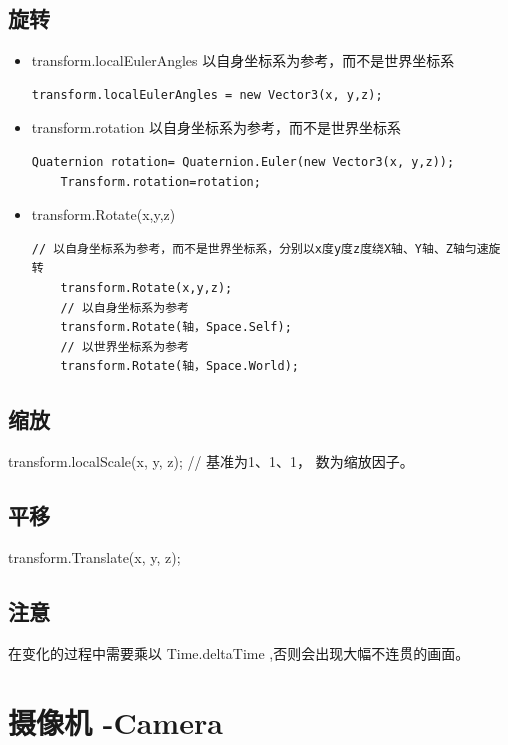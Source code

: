 \documentclass[UTF8,a4paper,12pt]{ctexbook}
\begin{document}
		\subsection{旋转}	
			\begin{itemize}
				\item transform.localEulerAngles 以自身坐标系为参考，而不是世界坐标系
					\begin{lstlisting}[xleftmargin = .02\textwidth]
	transform.localEulerAngles = new Vector3(x, y,z);
					\end{lstlisting}
				\item transform.rotation 以自身坐标系为参考，而不是世界坐标系
					\begin{lstlisting}[xleftmargin = .02\textwidth]
	Quaternion rotation= Quaternion.Euler(new Vector3(x, y,z));
	Transform.rotation=rotation;	
					\end{lstlisting}
				\item transform.Rotate(x,y,z)
					\begin{lstlisting}[xleftmargin = .02\textwidth]
	// 以自身坐标系为参考，而不是世界坐标系，分别以x度y度z度绕X轴、Y轴、Z轴匀速旋转
	transform.Rotate(x,y,z);
	// 以自身坐标系为参考
	transform.Rotate(轴，Space.Self);
	// 以世界坐标系为参考
	transform.Rotate(轴，Space.World);
					\end{lstlisting}
			\end{itemize}

		\subsection{缩放}
				transform.localScale(x, y, z); // 基准为1、1、1， 数为缩放因子。	
		\subsection{平移}
				transform.Translate(x, y, z); 
		\subsection{注意}
			在变化的过程中需要乘以 Time.deltaTime ,否则会出现大幅不连贯的画面。
	
	\section{摄像机 -Camera}
\end{document}
